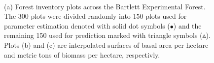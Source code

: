 \documentclass[a4paper]{article}
\begin{document}
\begin{figure}[h!]
  \begin{center}
    \\
  \end{center}
  \caption{(a) Forest inventory plots across the Bartlett Experimental Forest.  The 300 plots were divided randomly into 150 plots used for parameter estimation denoted with solid dot symbols ($\bullet$) and the remaining 150 used for prediction marked with triangle symbols ($\vartriangle$).  Plots (b) and (c) are interpolated surfaces of basal area per hectare and metric tons of biomass per hectare, respectivly.}
  \label{Real}
\end{figure}
\end{document}
